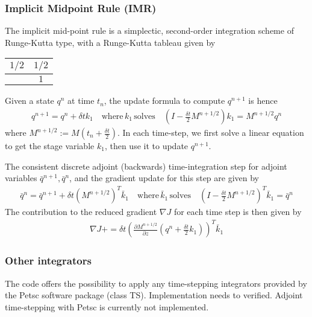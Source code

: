 \documentclass[letterpaper]{article}
\begin{document}
    \subsubsection{Implicit Midpoint Rule (IMR)} 
    The implicit mid-point rule is a simplectic, second-order integration scheme
    of Runge-Kutta type, with a Runge-Kutta tableau given by
    \begin{tabular}{ c | c }
      $1/2$ & $ 1/2$ \\
      \hline
                &  $1$
    \end{tabular}
    Given a state $q^n$ at time $t_n$, the update formula to compute $q^{n+1}$
    is hence 
    \begin{align}
      q^{n+1} = q^n + \delta t k_1 \quad \text{where} \, k_1 \, \text{solves}
      \quad \left( I-\frac{\delta t}{2} M^{n+1/2} \right) k_1 = M^{n+1/2}  q^n
    \end{align}
    where $M^{n+1/2} := M(t_n + \frac{\delta t}{2})$. In each time-step, we
    first solve a linear equation to get the stage variable $k_1$, then use it
    to update $q^{n+1}$. 

    The consistent discrete adjoint (backwards) time-integration step for
    adjoint variables $\bar q^{n+1}, \bar q^n$, and the gradient update for this
    step are given by
    \begin{align}
      \bar q^{n} = \bar q^{n+1} + \delta t \left(M^{n+1/2}\right)^T \bar k_1
      \quad \text{where} \, \bar k_1 \, \text{solves} \quad \left(
      I-\frac{\delta t}{2} M^{n+1/2}\right)^T  \bar k_1 = \bar q^n 
    \end{align}
    The contribution to the reduced gradient $\nabla J$ for each time step is
    then given by
    \begin{align}
      \nabla J += \delta t \left( \frac{\partial M^{n+1/2}}{\partial z}
      \left(q^n + \frac{\delta t}{2} k_1\right) \right)^T\bar k_1
    \end{align}


    \subsubsection{Other integrators}
    The code offers the possibility to apply any time-stepping integrators
    provided by the Petsc software package (class TS). Implementation needs to
    verified. Adjoint time-stepping with Petsc is currently not implemented. 
\end{document}

